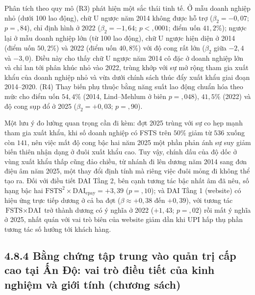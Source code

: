 \documentclass[
  a4paper,
  13pt]{extreport}
\begin{document}
Phân tích theo quy mô (R3) phát hiện một sắc thái tinh tế. Ở mẫu doanh
nghiệp nhỏ (dưới 100 lao động), chữ U ngược năm 2014 không được hỗ trợ
(\(\beta_2 = -0{,}07\); \(p = {,}84\)), chỉ định hình ở 2022
(\(\beta_2 = -1{,}64\); \(p < {,}0001\); điểm uốn \(41{,}2\%\)); ngược
lại ở mẫu doanh nghiệp lớn (từ 100 lao động), chữ U ngược hiện diện ở
2014 (điểm uốn \(50{,}2\%\)) và 2022 (điểm uốn \(40{,}8\%\)) với độ cong
rất lớn (\(\beta_2\) giữa \(-2{,}4\) và \(-3{,}0\)). Điều này cho thấy
chữ U ngược năm 2014 cô đặc ở doanh nghiệp lớn và chỉ lan tới phân khúc
nhỏ vào 2022, trùng khớp với sự mở rộng tham gia xuất khẩu của doanh
nghiệp nhỏ và vừa dưới chính sách thúc đẩy xuất khẩu giai đoạn
2014--2020. (R4) Thay biến phụ thuộc bằng năng suất lao động chuẩn hóa
theo mức cho điểm uốn \(54{,}4\%\) (2014, Lind--Mehlum ở biên
\(p = {,}048\)), \(41{,}5\%\) (2022) và độ cong sụp đổ ở 2025
(\(\beta_2 = +0{,}03\); \(p = {,}90\)).

Một lưu ý đo lường quan trọng cần đi kèm: đợt 2025 trùng với sự co hẹp
mạnh tham gia xuất khẩu, khi số doanh nghiệp có FSTS trên \(50\%\) giảm
từ \(536\) xuống còn \(141\), nên việc mất độ cong bậc hai năm 2025 một
phần phản ánh sự suy giảm biến thiên nhận dạng ở đuôi xuất khẩu cao. Tuy
vậy, chính dấu của độ dốc ở vùng xuất khẩu thấp cũng đảo chiều, từ nhánh
đi lên dương năm 2014 sang đơn điệu âm năm 2025, một thay đổi định tính
mà riêng việc đuôi mỏng đi không thể tạo ra. Đối với điều tiết DAI Tầng
2, bên cạnh tương tác bậc nhất âm đã nêu, số hạng bậc hai
\(\text{FSTS}^2 \times \text{DAI}_{\text{epay}} = +3{,}39\)
(\(p = {,}10\)); và DAI Tầng 1 (website) có hiệu ứng trực tiếp dương ở
cả ba đợt (\(\beta \approx +0{,}38\) đến \(+0{,}39\)), với tương tác
\(\text{FSTS} \times \text{DAI}\) trở thành dương có ý nghĩa ở 2022
(\(+1{,}43\); \(p = {,}02\)) rồi mất ý nghĩa ở 2025, nhất quán với vai
trò biên của website giảm dần khi UPI hấp thụ phần tương tác số hướng
tới khách hàng.

\hypertarget{bux1eb1ng-chux1ee9ng-tux1eadp-trung-vuxe0o-quux1ea3n-trux1ecb-cux1ea5p-cao-tux1ea1i-ux1ea5n-ux111ux1ed9-vai-truxf2-ux111iux1ec1u-tiux1ebft-cux1ee7a-kinh-nghiux1ec7m-vuxe0-giux1edbi-tuxednh-chux1b0ux1a1ng-suxe1ch}{%
\subsection{4.8.4 Bằng chứng tập trung vào quản trị cấp cao tại Ấn Độ:
vai trò điều tiết của kinh nghiệm và giới tính (chương
sách)}\label{bux1eb1ng-chux1ee9ng-tux1eadp-trung-vuxe0o-quux1ea3n-trux1ecb-cux1ea5p-cao-tux1ea1i-ux1ea5n-ux111ux1ed9-vai-truxf2-ux111iux1ec1u-tiux1ebft-cux1ee7a-kinh-nghiux1ec7m-vuxe0-giux1edbi-tuxednh-chux1b0ux1a1ng-suxe1ch}}
\end{document}
